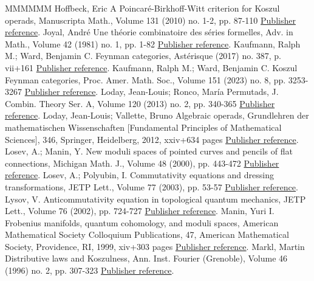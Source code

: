 \documentclass[11pt]{article}
\theoremstyle{definition}
\numberwithin{equation}{section}
\begin{document}
\begin{thebibliography}{MMMMMM}
 Hoffbeck, Eric A Poincaré-Birkhoff-Witt criterion for Koszul operads, Manuscripta Math., Volume 131 (2010) no. 1-2, pp. 87-110 \href{https://alco.centre-mersenne.org/articles/10.5802/alco.347/#MR2574993}{Publisher reference}.
 Joyal, André Une théorie combinatoire des séries formelles, Adv. in Math., Volume 42 (1981) no. 1, pp. 1-82 \href{https://alco.centre-mersenne.org/articles/10.5802/alco.347/#MR633783}{Publisher reference}.
 Kaufmann, Ralph M.; Ward, Benjamin C. Feynman categories, Astérisque (2017) no. 387, p. vii+161 \href{https://alco.centre-mersenne.org/articles/10.5802/alco.347/#MR3636409}{Publisher reference}.
 Kaufmann, Ralph M.; Ward, Benjamin C. Koszul Feynman categories, Proc. Amer. Math. Soc., Volume 151 (2023) no. 8, pp. 3253-3267 \href{https://alco.centre-mersenne.org/articles/10.5802/alco.347/#KWKoszul}{Publisher reference}.
 Loday, Jean-Louis; Ronco, María Permutads, J. Combin. Theory Ser. A, Volume 120 (2013) no. 2, pp. 340-365 \href{https://alco.centre-mersenne.org/articles/10.5802/alco.347/#MR2995045}{Publisher reference}.
 Loday, Jean-Louis; Vallette, Bruno Algebraic operads, Grundlehren der mathematischen Wissenschaften [Fundamental Principles of Mathematical Sciences], 346, Springer, Heidelberg, 2012, xxiv+634 pages \href{https://alco.centre-mersenne.org/articles/10.5802/alco.347/#MR2954392}{Publisher reference}.
 Losev, A.; Manin, Y. New moduli spaces of pointed curves and pencils of flat connections, Michigan Math. J., Volume 48 (2000), pp. 443-472 \href{https://alco.centre-mersenne.org/articles/10.5802/alco.347/#MR1786500}{Publisher reference}.
 Losev, A.; Polyubin, I. Commutativity equations and dressing transformations, JETP Lett., Volume 77 (2003), pp. 53-57 \href{https://alco.centre-mersenne.org/articles/10.5802/alco.347/#LosevPolyubin}{Publisher reference}.
 Lysov, V. Anticommutativity equation in topological quantum mechanics, JETP Lett., Volume 76 (2002), pp. 724-727 \href{https://alco.centre-mersenne.org/articles/10.5802/alco.347/#Lysov}{Publisher reference}.
 Manin, Yuri I. Frobenius manifolds, quantum cohomology, and moduli spaces, American Mathematical Society Colloquium Publications, 47, American Mathematical Society, Providence, RI, 1999, xiv+303 pages \href{https://alco.centre-mersenne.org/articles/10.5802/alco.347/#MR1702284}{Publisher reference}.
 Markl, Martin Distributive laws and Koszulness, Ann. Inst. Fourier (Grenoble), Volume 46 (1996) no. 2, pp. 307-323 \href{https://alco.centre-mersenne.org/articles/10.5802/alco.347/#MR1393517}{Publisher reference}.

\end{thebibliography}
\end{document}
